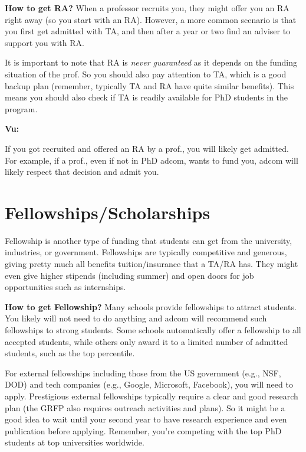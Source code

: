 \documentclass[oneside,11pt,dvipsnames]{book}
\newenvironment{commentbox}[1][]{
  \small
  \begin{mybox}
    {\small \textbf{#1}}
  }{
  \end{mybox}
}
\begin{document}
\textbf{How to get RA?} When a professor recruits you, they might offer you an RA right away (so you start with an RA).  However, a more common scenario is that you first get admitted with TA, and then after a year or two find an adviser to support you with RA.

It is important to note that RA is \emph{never guaranteed} as it depends on the funding situation of the prof. So you should also pay attention to TA, which is a good backup plan (remember, typically TA and RA have quite similar benefits). This means you should also check if TA is readily available for PhD students in the program.


\begin{commentbox}[Vu:]
  If you got recruited and offered an RA by a prof., you will likely get admitted.  For example, if a prof., even if not in PhD adcom, wants to fund you, adcom will likely respect that decision and admit you.
\end{commentbox}

\section{Fellowships/Scholarships}\label{sec:fellowships}

Fellowship is another type of funding that students can get from the university, industries, or government.
Fellowships are typically competitive and generous, giving pretty much all benefits tuition/insurance that a TA/RA has.  They might even give higher stipends (including summer) and open doors for job opportunities such as internships.

\textbf{How to get Fellowship?}   Many schools provide fellowships to attract students. You likely will not need to do anything and adcom will recommend such fellowships to strong students. Some schools automatically offer a fellowship to all accepted students, while others only award it to a limited number of admitted students, such as the top percentile.

For external fellowships including those from the US government (e.g., NSF, DOD) and tech companies (e.g., Google, Microsoft, Facebook), you will need to apply.  %
Prestigious external fellowships typically require a clear and good research plan (the GRFP also requires outreach activities and plans). So it might be a good idea to wait until your second year to have research experience and even publication before applying. Remember, you're competing with the top PhD students at top universities worldwide.
\end{document}
